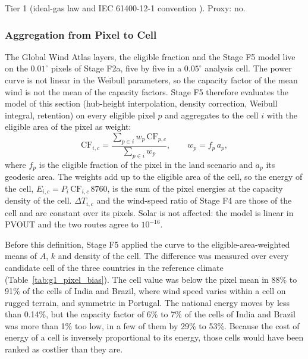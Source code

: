 Tier 1 (ideal-gas law and IEC 61400-12-1 convention
\cite{iec61400122022}). Proxy: no.

\subsubsection{Aggregation from Pixel to Cell}
\label{subsec:g1_pixel_aggregation}

The Global Wind Atlas layers, the eligible fraction and the Stage F5 model
live on the $0.01^\circ$ pixels of Stage F2a, five by five in a
$0.05^\circ$ analysis cell. The power curve is not linear in the
Weibull parameters, so the capacity factor of the mean wind is not the mean
of the capacity factors. Stage F5 therefore evaluates the model of this
section (hub-height interpolation, density correction, Weibull integral,
retention) on every eligible pixel $p$ and aggregates to the cell $i$ with
the eligible area of the pixel as weight:
\begin{equation}
    \mathrm{CF}_{i,c} = \frac{\sum_{p\in i} w_p\,\mathrm{CF}_{p,c}}
      {\sum_{p\in i} w_p},
    \qquad w_p = f_p\,a_p,
    \label{eq:g1_wind_pixel_aggregation}
\end{equation}
where $f_p$ is the eligible fraction of the pixel in the land scenario and
$a_p$ its geodesic area. The weights add up to the eligible area of the
cell, so the energy of the cell,
$E_{i,c}=P_i\,\mathrm{CF}_{i,c}\,8760$, is the sum of the pixel energies at
the capacity density of the cell. $\Delta T_{i,c}$ and the wind-speed ratio
of Stage F4 are those of the cell and are constant over its pixels. Solar
is not affected: the model is linear in PVOUT and the two routes agree to
$10^{-16}$.

Before this definition, Stage F5 applied the curve to the eligible-area-weighted means of $A$, $k$ and
density of the cell. The difference was measured over every candidate cell of the
three countries in the reference climate
(Table~\ref{tab:g1_pixel_bias}). The cell value was below the pixel mean in
88\% to 91\% of the cells of India and Brazil, where wind speed varies
within a cell on rugged terrain, and symmetric in Portugal. The national energy moves by
less than 0.14\%, but the capacity factor of 6\% to 7\% of the
cells of India and Brazil was more than 1\% too low, in a few of them by 29\% to 53\%.
Because the cost of energy of a cell is inversely proportional to its energy, those cells would
have been ranked as costlier than they are.

